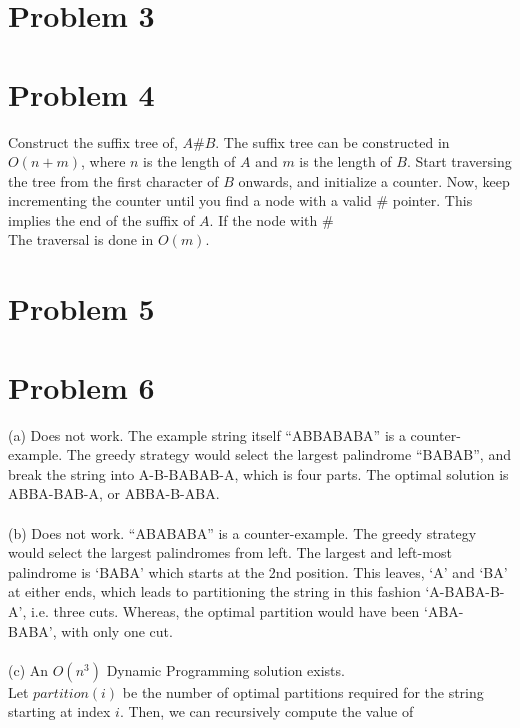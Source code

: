 \documentclass{article}
\begin{document}
\section{Problem 3}
\clearpage

\section{Problem 4}
Construct the suffix tree of, {$ A\#B $}. 
The suffix tree can be constructed in {$ O(n+m) $}, where {$ n $} is 
the length of {$ A $} and {$ m $} is the length of {$ B $}. 
Start traversing the tree from the first character of {$ B $} onwards, 
and initialize a counter. Now, keep incrementing the counter until you 
find a node with a valid \# pointer. This implies the end of the suffix 
of {$ A $}. If the node with \# 
\\
The traversal is done in {$ O(m) $}. 
\clearpage

\section{Problem 5}
\clearpage

\section{Problem 6}
(a) Does not work. The example string itself “ABBABABA” is a 
counter-example. The greedy strategy would select the largest 
palindrome “BABAB”, and break the string into A-B-BABAB-A, 
which is four parts. The optimal solution is ABBA-BAB-A, or ABBA-B-ABA.\\
\\
(b) Does not work. “ABABABA” is a counter-example. The greedy strategy 
would select the largest palindromes from left. The largest and left-most
palindrome is `BABA' which starts at the 2nd position. This leaves, `A' and
`BA' at either ends, which leads to partitioning the string in this fashion
`A-BABA-B-A', i.e. three cuts. Whereas, the optimal partition would have
been `ABA-BABA', with only one cut.\\
\\
(c) An {$ O(n^3) $} Dynamic Programming solution exists.\\
Let $partition(i)$ be the number of optimal partitions required for the string starting at index $i$. Then, we can recursively compute the value of 
\end{document}

